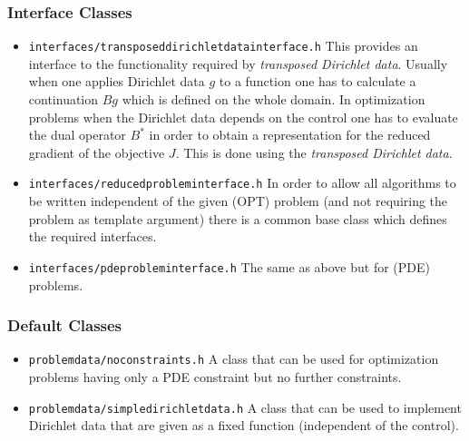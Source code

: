 \documentclass[prodmode,acmtoms]{acmsmall}
\numberwithin{equation}{section}
\begin{document}
\subsubsection{Interface Classes}
\begin{itemize}
  \item \texttt{interfaces/transposeddirichletdatainterface.h} This provides an interface to 
    the functionality required by {\em transposed Dirichlet data}. Usually when one applies Dirichlet 
    data $g$ to a function one has to calculate a continuation $Bg$ which is defined on the whole domain.
    In optimization problems when the Dirichlet data depends on the control one has to evaluate the 
    dual operator $B^*$ in order to obtain a representation for the reduced gradient of the objective $J$.
    This is done using the {\em transposed Dirichlet data}.
  \item \texttt{interfaces/reducedprobleminterface.h} In order to allow all algorithms to be written independent
    of the given (OPT) problem 
    (and not requiring the problem as template argument) there is a common base class which 
    defines the required interfaces. 
  \item \texttt{interfaces/pdeprobleminterface.h} The same as above but for (PDE) problems.
\end{itemize}

\subsubsection{Default Classes}
\begin{itemize}
  \item \texttt{problemdata/noconstraints.h} A class that can be used for optimization problems 
    having only a PDE constraint but no further constraints.
  \item \texttt{problemdata/simpledirichletdata.h} A class that can be used to implement Dirichlet
    data that are given as a fixed function (independent of the control).
  \end{itemize}
\end{document}
